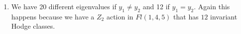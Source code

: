 \documentclass[11pt]{amsart}
\newcounter{num}[section] %
\begin{document}
\begin{enumerate}
\medskip

\noindent\textbf{Case \(y_1=y_2=t\).}
Then
\[
\chi_M(\lambda)
=
(\lambda^4-8192t)\,\bigl(\lambda^8+2816t\,\lambda^4-65536t^2\bigr)^2.
\]
Equivalently,
\[
\lambda^4=8192t,
\]
or
\[
\lambda^4=128t(5\sqrt5-11),
\qquad
\lambda^4=-128t(11+5\sqrt5).
\]
Hence the eigenvalues are
\[
\lambda=\omega^k(8192t)^{1/4},\qquad k=0,1,2,3,
\]
\[
\lambda=\omega^k\bigl(128t(5\sqrt5-11)\bigr)^{1/4},\qquad k=0,1,2,3,
\]
\[
\lambda=\omega^k\bigl(-128t(11+5\sqrt5)\bigr)^{1/4},\qquad k=0,1,2,3.
\]


\item[3)] We have 20 different eigenvalues if $y_1 \neq y_2$ and 12 if $y_1=y_2$. Again this happens because we have a $Z_2$ action in $Fl(1,4,5)$ that has $12$ invariant Hodge classes. 
\end{enumerate}
\end{document}
